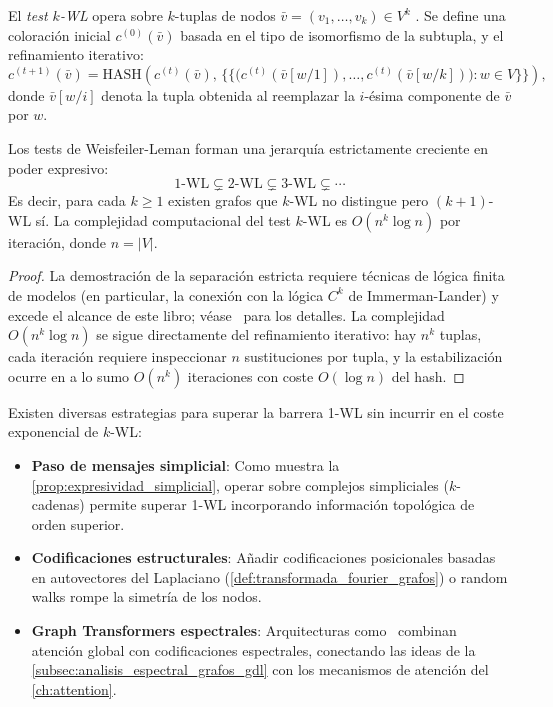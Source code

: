 \begin{definition}\label{def:k_wl}
	El \textit{test $k$-\gls{WL}} opera sobre $k$-tuplas de nodos $\bar{v} = (v_1, \ldots, v_k) \in V^k$ \citep{morris2019weisfeiler}. Se define una coloración inicial $c^{(0)}(\bar{v})$ basada en el tipo de isomorfismo de la subtupla, y el refinamiento iterativo:
	\[
		c^{(t+1)}(\bar{v}) = \mathrm{HASH}\!\left(c^{(t)}(\bar{v}),\, \bigl\{\!\!\bigl\{ \bigl(c^{(t)}(\bar{v}[w/1]), \ldots, c^{(t)}(\bar{v}[w/k])\bigr) : w \in V \bigr\}\!\!\bigr\}\right),
	\]
	donde $\bar{v}[w/i]$ denota la tupla obtenida al reemplazar la $i$-ésima componente de $\bar{v}$ por $w$.
\end{definition}

\begin{proposition}\label{prop:jerarquia_kwl}
	Los tests de Weisfeiler-Leman forman una jerarquía estrictamente creciente en poder expresivo:
	\[
		1\text{-WL} \subsetneq 2\text{-WL} \subsetneq 3\text{-WL} \subsetneq \cdots
	\]
	Es decir, para cada $k \geq 1$ existen grafos que $k$-WL no distingue pero $(k+1)$-WL sí. La complejidad computacional del test $k$-WL es $O(n^k \log n)$ por iteración, donde $n = |V|$.
\end{proposition}

\begin{proof}
	La demostración de la separación estricta requiere técnicas de lógica finita de modelos (en particular, la conexión con la lógica $C^k$ de Immerman-Lander) y excede el alcance de este libro; véase~\citet{morris2019weisfeiler} para los detalles. La complejidad $O(n^k \log n)$ se sigue directamente del refinamiento iterativo: hay $n^k$ tuplas, cada iteración requiere inspeccionar $n$ sustituciones por tupla, y la estabilización ocurre en a lo sumo $O(n^k)$ iteraciones con coste $O(\log n)$ del hash.
\end{proof}

Existen diversas estrategias para superar la barrera 1-WL sin incurrir en el coste exponencial de $k$-WL:
\begin{itemize}
	\item \textbf{Paso de mensajes simplicial}: Como muestra la \autoref{prop:expresividad_simplicial}, operar sobre complejos simpliciales ($k$-cadenas) permite superar 1-WL incorporando información topológica de orden superior.
	\item \textbf{Codificaciones estructurales}: Añadir codificaciones posicionales basadas en autovectores del Laplaciano (\autoref{def:transformada_fourier_grafos}) o random walks rompe la simetría de los nodos.
	\item \textbf{Graph Transformers espectrales}: Arquitecturas como~\citet{kreuzer2021spectral} combinan atención global con codificaciones espectrales, conectando las ideas de la \autoref{subsec:analisis_espectral_grafos_gdl} con los mecanismos de atención del \autoref{ch:attention}.
\end{itemize}

